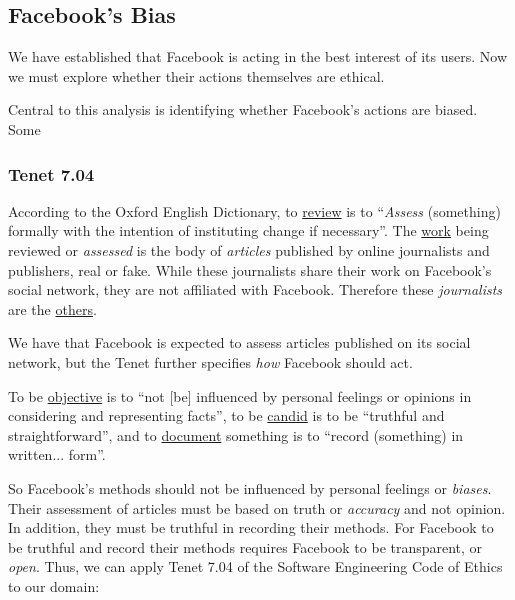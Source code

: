 
\subsection{Facebook's Bias}

\par We have established that Facebook is acting in the best interest of its users. Now we must explore whether their actions themselves are ethical.

\par Central to this analysis is identifying whether Facebook's actions are biased. Some 

\subsubsection{Tenet 7.04}


\par According to the Oxford English Dictionary, to \ul{review} is to ``\emph{Assess} (something) formally with the intention of instituting change if necessary''. \cite{oxford} The \ul{work} being reviewed or \emph{assessed} is the body of \emph{articles} published by online journalists and publishers, real or fake. While these journalists share their work on Facebook's social network, they are not affiliated with Facebook. Therefore these \emph{journalists} are the \ul{others}.

\par We have that Facebook is expected to assess articles published on its social network, but the Tenet further specifies \emph{how} Facebook should act. 

\par To be \ul{objective} is to ``not [be] influenced by personal feelings or opinions in considering and representing facts'', \cite{oxford} to be \ul{candid} is to be ``truthful and straightforward'', \cite{oxford} and to \ul{document} something is to ``record (something) in written... form''. \cite{oxford}

\par So Facebook's methods should not be influenced by personal feelings or \emph{biases}. Their assessment of articles must be based on truth or \emph{accuracy} and not opinion. In addition, they must be truthful in recording their methods. For Facebook to be truthful and record their methods requires Facebook to be transparent, or \emph{open}. Thus, we can apply Tenet 7.04 of the Software Engineering Code of Ethics to our domain:

